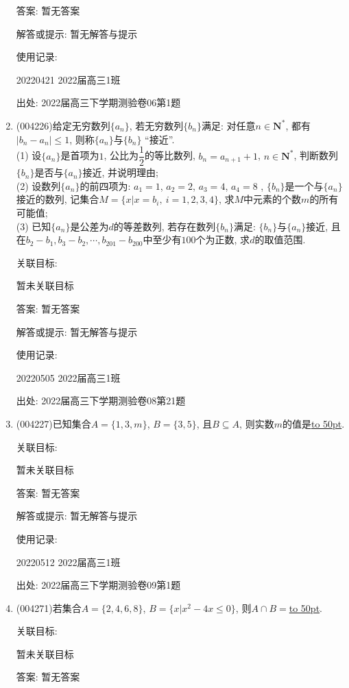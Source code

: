 \documentclass[10pt,a4paper]{article}
\newcommand{\blank}[1]{\underline{\hbox to #1pt{}}}
\begin{document}
\begin{enumerate}[1.]
答案: 暂无答案

解答或提示: 暂无解答与提示

使用记录:

20220421	2022届高三1班	


出处: 2022届高三下学期测验卷06第1题
\item { (004226)}给定无穷数列$\{a_n\}$, 若无穷数列$\{b_n\}$满足: 对任意$n\in \mathbf{N}^*$, 都有$|b_n-a_n|\le 1$, 则称$\{a_n\}$与$\{b_n\}$ ``接近''.\\
(1) 设$\{a_n\}$是首项为$1$, 公比为$\dfrac 12$的等比数列, $b_n=a_{n+1}+1$, $n\in \mathbf{N}^*$, 判断数列$\{b_n\}$是否与$\{a_n\}$接近, 并说明理由;\\
(2) 设数列$\{a_n\}$的前四项为: $a_1=1$, $a_2=2$, $a_3=4$, $a_4=8$ , $\{b_n\}$是一个与$\{a_n\}$接近的数列, 记集合$M=\{x|x=b_i,\ i=1,2,3,4\}$, 求$M$中元素的个数$m$的所有可能值;\\
(3) 已知$\{a_n\}$是公差为$d$的等差数列, 若存在数列$\{b_n\}$满足: $\{b_n\}$与$\{a_n\}$接近, 且在$b_2-b_1,b_3-b_2,\cdots,b_{201}-b_{200}$中至少有$100$个为正数, 求$d$的取值范围.


关联目标:

暂未关联目标

答案: 暂无答案

解答或提示: 暂无解答与提示

使用记录:

20220505	2022届高三1班			


出处: 2022届高三下学期测验卷08第21题
\item { (004227)}已知集合$A=\{1,3,m\}$, $B=\{3,5\}$, 且$B\subseteq A$, 则实数$m$的值是\blank{50}.


关联目标:

暂未关联目标

答案: 暂无答案

解答或提示: 暂无解答与提示

使用记录:

20220512	2022届高三1班	


出处: 2022届高三下学期测验卷09第1题
\item { (004271)}若集合$A=\{2,4,6,8\}$, $B=\{x|x^2-4x\le 0\}$, 则$A\cap B=$\blank{50}.


关联目标:

暂未关联目标

答案: 暂无答案


\end{enumerate}
\end{document}
